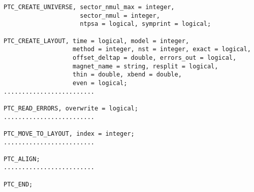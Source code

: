 

\begin{verbatim}
PTC_CREATE_UNIVERSE, sector_nmul_max = integer,
                     sector_nmul = integer, 
                     ntpsa = logical, symprint = logical;

PTC_CREATE_LAYOUT, time = logical, model = integer,
                   method = integer, nst = integer, exact = logical,
                   offset_deltap = double, errors_out = logical,
                   magnet_name = string, resplit = logical, 
                   thin = double, xbend = double, 
                   even = logical;
.........................

PTC_READ_ERRORS, overwrite = logical;
.........................

PTC_MOVE_TO_LAYOUT, index = integer;
.........................

PTC_ALIGN;
.........................

PTC_END;
\end{verbatim}

